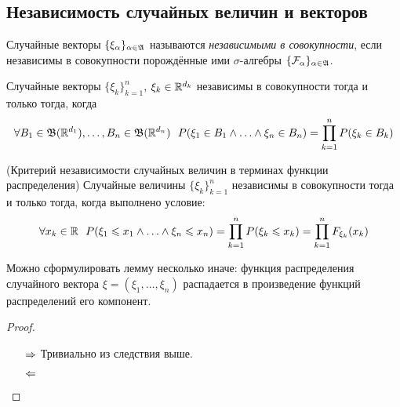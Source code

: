 \subsection{Независимость случайных величин и векторов}

\begin{definition}
	Случайные векторы $\{\xi_\alpha\}_{\alpha \in \mathfrak{A}}$ называются \textit{независимыми в совокупности}, если независимы в совокупности порождённые ими $\sigma$-алгебры $\{\mathcal{F}_\alpha\}_{\alpha \in \mathfrak{A}}$.
\end{definition}

\begin{corollary}
	Случайные векторы $\{\xi_k\}_{k = 1}^n$, $\xi_k \in \mathbb{R}^{d_k}$ независимы в совокупности тогда и только тогда, когда
	\[
		\forall B_1 \in \mathfrak{B}(\mathbb{R}^{d_1}), \ldots, B_n \in \mathfrak{B}(\mathbb{R}^{d_n})\ \ P(\xi_1 \in B_1 \wedge \ldots \wedge \xi_n \in B_n) = \prod_{k = 1}^n P(\xi_k \in B_k)
	\]
\end{corollary}

\begin{lemma} (Критерий независимости случайных величин в терминах функции распределения)
	Случайные величины $\{\xi_k\}_{k = 1}^n$ независимы в совокупности тогда и только тогда, когда выполнено условие:
	\[
		\forall x_k \in \mathbb{R}\ \ P(\xi_1 \leqslant x_1 \wedge \ldots \wedge \xi_n \leqslant x_n) = \prod_{k = 1}^n P(\xi_k \leqslant x_k) = \prod_{k = 1}^n F_{\xi_k}(x_k)
	\]
\end{lemma}

\begin{note}
	Можно сформулировать лемму несколько иначе: функция распределения случайного вектора $\xi = (\xi_1, \ldots, \xi_n)$ распадается в произведение функций распределений его компонент.
\end{note}

\begin{proof}~
	\begin{itemize}
		\item[$\Rightarrow$] Тривиально из следствия выше.
		
		\item[$\Leftarrow$]
	\end{itemize}
\end{proof}